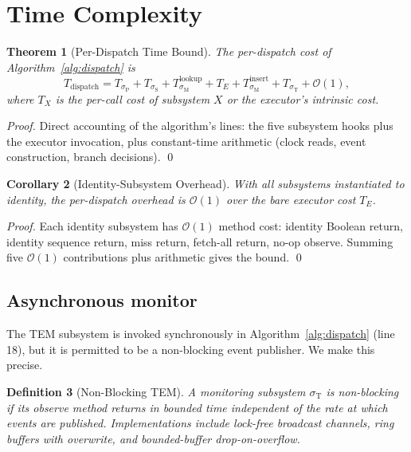 \documentclass[twocolumn,11pt,a4paper]{article}
\newtheorem{theorem}{Theorem}[section]
\newtheorem{corollary}[theorem]{Corollary}
\newtheorem{definition}[theorem]{Definition}
\DeclareMathOperator{\dispatch}{dispatch}
\newcommand{\Sub}{\sigma}
\newcommand{\Exec}{E}
\newcommand{\Pve}{\Sub_{\mathrm{P}}}
\newcommand{\Cmm}{\Sub_{\mathrm{M}}}
\newcommand{\Pss}{\Sub_{\mathrm{S}}}
\newcommand{\Tem}{\Sub_{\mathrm{T}}}
\begin{document}
\section{Time Complexity}
\label{sec:complexity}

\begin{theorem}[Per-Dispatch Time Bound]
\label{thm:per-dispatch}
The per-dispatch cost of Algorithm~\ref{alg:dispatch} is
\[
T_{\dispatch} = T_{\Pve} + T_{\Pss} + T_{\Cmm}^\mathrm{lookup} + T_{\Exec} + T_{\Cmm}^\mathrm{insert} + T_{\Tem} + \mathcal{O}(1),
\]
where $T_X$ is the per-call cost of subsystem $X$ or the executor's intrinsic cost.
\end{theorem}

\begin{proof}
Direct accounting of the algorithm's lines: the five subsystem hooks plus the executor invocation, plus constant-time arithmetic (clock reads, event construction, branch decisions). \qed
\end{proof}

\begin{corollary}[Identity-Subsystem Overhead]
\label{cor:identity-overhead}
With all subsystems instantiated to identity, the per-dispatch overhead is $\mathcal{O}(1)$ over the bare executor cost $T_{\Exec}$.
\end{corollary}

\begin{proof}
Each identity subsystem has $\mathcal{O}(1)$ method cost: identity Boolean return, identity sequence return, miss return, fetch-all return, no-op observe. Summing five $\mathcal{O}(1)$ contributions plus arithmetic gives the bound. \qed
\end{proof}

\subsection{Asynchronous monitor}

The TEM subsystem is invoked synchronously in Algorithm~\ref{alg:dispatch} (line 18), but it is permitted to be a non-blocking event publisher. We make this precise.

\begin{definition}[Non-Blocking TEM]
\label{def:non-blocking-tem}
A monitoring subsystem $\Tem$ is \emph{non-blocking} if its observe method returns in bounded time independent of the rate at which events are published. Implementations include lock-free broadcast channels, ring buffers with overwrite, and bounded-buffer drop-on-overflow.
\end{definition}
\end{document}
